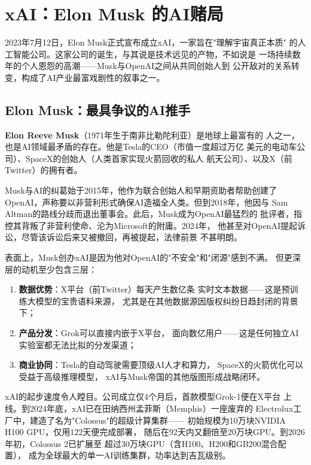 \section{xAI：Elon Musk 的AI赌局}
\label{sec:xai}

2023年7月12日，Elon Musk正式宣布成立xAI，一家旨在"理解宇宙真正本质"
的人工智能公司。这家公司的诞生，与其说是技术远见的产物，不如说是
一场持续数年的个人恩怨的高潮——Musk与OpenAI之间从共同创始人到
公开敌对的关系转变，构成了AI产业最富戏剧性的叙事之一。

\subsection{Elon Musk：最具争议的AI推手}

\textbf{Elon Reeve Musk}（1971年生于南非比勒陀利亚）是地球上最富有的
人之一，也是AI领域最矛盾的存在。他是Tesla的CEO（市值一度超过万亿
美元的电动车公司）、SpaceX的创始人（人类首家实现火箭回收的私人
航天公司）、以及X（前Twitter）的拥有者。

Musk与AI的纠葛始于2015年，他作为联合创始人和早期资助者帮助创建了
OpenAI，声称要以非营利形式确保AI造福全人类。但到2018年，他因与
Sam Altman的路线分歧而退出董事会。此后，Musk成为OpenAI最猛烈的
批评者，指控其背叛了非营利使命、沦为Microsoft的附庸。2024年，
他甚至对OpenAI提起诉讼，尽管该诉讼后来又被撤回，再被提起，法律前景
不甚明朗。

\begin{whybox}[为什么Musk要亲自下场做AI？]
表面上，Musk创办xAI是因为他对OpenAI的"不安全"和"闭源"感到不满。
但更深层的动机至少包含三层：
\begin{enumerate}
  \item \textbf{数据优势}：X平台（前Twitter）每天产生数亿条
    实时文本数据——这是预训练大模型的宝贵语料来源，
    尤其是在其他数据源因版权纠纷日趋封闭的背景下；
  \item \textbf{产品分发}：Grok可以直接内嵌于X平台，
    面向数亿用户——这是任何独立AI实验室都无法比拟的分发渠道；
  \item \textbf{商业协同}：Tesla的自动驾驶需要顶级AI人才和算力，
    SpaceX的火箭优化可以受益于高级推理模型，
    xAI与Musk帝国的其他版图形成战略闭环。
\end{enumerate}
\end{whybox}

xAI的起步速度令人瞠目。公司成立仅4个月后，首款模型Grok-1便在X平台
上线。到2024年底，xAI已在田纳西州孟菲斯（Memphis）一座废弃的
Electrolux工厂中，建造了名为"Colossus"的超级计算集群——
初始规模为10万块NVIDIA H100 GPU，仅用122天便完成部署，
随后在92天内又翻倍至20万块GPU。到2026年初，Colossus 2已扩展至
超过30万块GPU（含H100、H200和GB200混合配置），
成为全球最大的单一AI训练集群，功率达到吉瓦级别。

